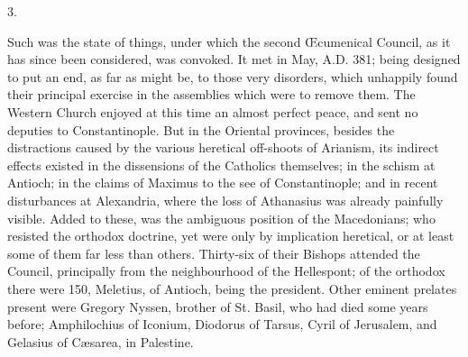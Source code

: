 3.

Such was the state of things, under which the second Œcumenical
Council, as it has since been considered, was convoked. It met in May,
A.D. 381; being designed to put an end, as far
as might be, to those very disorders, which unhappily found their
principal exercise in the assemblies which were to remove them. The
Western Church enjoyed at this time an almost perfect peace, and sent
no deputies to Constantinople. But in the Oriental provinces, besides
the distractions caused by the various heretical off-shoots of
Arianism, its indirect effects existed in the dissensions of the
Catholics themselves; in the schism at Antioch; in the claims of
Maximus to the see of Constantinople; and in recent disturbances
at Alexandria, where the loss of Athanasius was already painfully
visible. Added to these, was the ambiguous position of the
Macedonians; who resisted the orthodox doctrine, yet were only by
implication heretical, or at least some of them far less than others.
Thirty-six of their Bishops attended the Council, principally from the
neighbourhood of the Hellespont; of the orthodox there were 150,
Meletius, of Antioch, being the president. Other eminent prelates
present were Gregory Nyssen, brother of St. Basil, who had died some
years before; Amphilochius of Iconium, Diodorus of Tarsus, Cyril of
Jerusalem, and Gelasius of Cæsarea, in Palestine.


